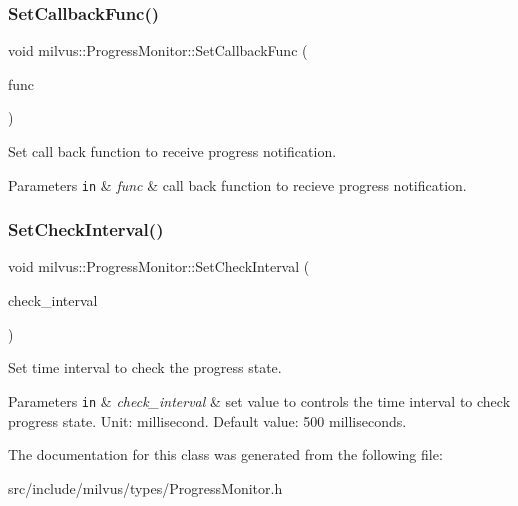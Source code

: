 \subsubsection{\texorpdfstring{Set\+Callback\+Func()}{SetCallbackFunc()}}
{\footnotesize\ttfamily void milvus\+::\+Progress\+Monitor\+::\+Set\+Callback\+Func (\begin{DoxyParamCaption}\item[{const \hyperlink{classmilvus_1_1_progress_monitor_a8d463fa6891b76c10e1088294f64d81f}{Callback\+Func} \&}]{func }\end{DoxyParamCaption})\hspace{0.3cm}{\ttfamily [inline]}}



Set call back function to receive progress notification. 


\begin{DoxyParams}[1]{Parameters}
\mbox{\tt in}  & {\em func} & call back function to recieve progress notification. \\
\hline
\end{DoxyParams}
\mbox{\label{classmilvus_1_1_progress_monitor_adee24b68d0ced028bb961043e69faed9}} 
\subsubsection{\texorpdfstring{Set\+Check\+Interval()}{SetCheckInterval()}}
{\footnotesize\ttfamily void milvus\+::\+Progress\+Monitor\+::\+Set\+Check\+Interval (\begin{DoxyParamCaption}\item[{uint32\+\_\+t}]{check\+\_\+interval }\end{DoxyParamCaption})\hspace{0.3cm}{\ttfamily [inline]}}



Set time interval to check the progress state. 


\begin{DoxyParams}[1]{Parameters}
\mbox{\tt in}  & {\em check\+\_\+interval} & set value to controls the time interval to check progress state. Unit\+: millisecond. Default value\+: 500 milliseconds. \\
\hline
\end{DoxyParams}


The documentation for this class was generated from the following file\+:\begin{DoxyCompactItemize}
\item 
src/include/milvus/types/Progress\+Monitor.\+h\end{DoxyCompactItemize}
